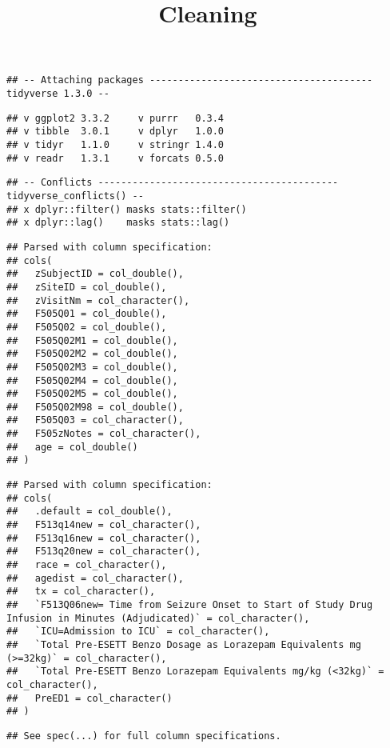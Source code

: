 \documentclass[
]{article}
\title{Cleaning}
\author{}
\date{\vspace{-2.5em}}
\begin{document}
\maketitle

\begin{verbatim}
## -- Attaching packages --------------------------------------- tidyverse 1.3.0 --
\end{verbatim}

\begin{verbatim}
## v ggplot2 3.3.2     v purrr   0.3.4
## v tibble  3.0.1     v dplyr   1.0.0
## v tidyr   1.1.0     v stringr 1.4.0
## v readr   1.3.1     v forcats 0.5.0
\end{verbatim}

\begin{verbatim}
## -- Conflicts ------------------------------------------ tidyverse_conflicts() --
## x dplyr::filter() masks stats::filter()
## x dplyr::lag()    masks stats::lag()
\end{verbatim}

\begin{verbatim}
## Parsed with column specification:
## cols(
##   zSubjectID = col_double(),
##   zSiteID = col_double(),
##   zVisitNm = col_character(),
##   F505Q01 = col_double(),
##   F505Q02 = col_double(),
##   F505Q02M1 = col_double(),
##   F505Q02M2 = col_double(),
##   F505Q02M3 = col_double(),
##   F505Q02M4 = col_double(),
##   F505Q02M5 = col_double(),
##   F505Q02M98 = col_double(),
##   F505Q03 = col_character(),
##   F505zNotes = col_character(),
##   age = col_double()
## )
\end{verbatim}

\begin{verbatim}
## Parsed with column specification:
## cols(
##   .default = col_double(),
##   F513q14new = col_character(),
##   F513q16new = col_character(),
##   F513q20new = col_character(),
##   race = col_character(),
##   agedist = col_character(),
##   tx = col_character(),
##   `F513Q06new= Time from Seizure Onset to Start of Study Drug Infusion in Minutes (Adjudicated)` = col_character(),
##   `ICU=Admission to ICU` = col_character(),
##   `Total Pre-ESETT Benzo Dosage as Lorazepam Equivalents mg (>=32kg)` = col_character(),
##   `Total Pre-ESETT Benzo Lorazepam Equivalents mg/kg (<32kg)` = col_character(),
##   PreED1 = col_character()
## )
\end{verbatim}

\begin{verbatim}
## See spec(...) for full column specifications.
\end{verbatim}
\end{document}
